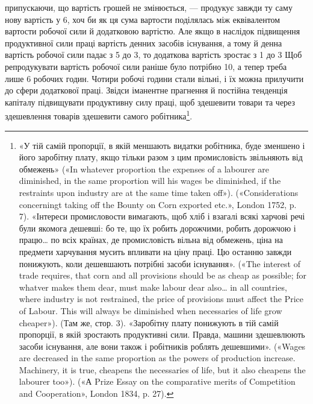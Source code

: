 \parcont{}  %
припускаючи, що вартість грошей не змінюється, — продукує
завжди ту саму нову вартість у 6, хоч би як ця сума
вартости поділялась між еквівалентом вартости робочої сили й
додатковою вартістю. Але якщо в наслідок підвищення продуктивної сили праці
вартість денних засобів існування, а тому й
денна вартість робочої сили падає з 5 до 3, то додаткова
вартість зростає з 1 до 3 Щоб репродукувати
вартість робочої сили раніше було потрібно 10, а тепер треба
лише 6 робочих годин. Чотири робочі години стали вільні, і їх
можна прилучити до сфери додаткової праці. Звідси іманентне
прагнення й постійна тенденція капіталу підвищувати продуктивну
силу праці, щоб здешевити товари та через здешевлення товарів
здешевити самого робітника\footnote{
«У тій самій пропорції, в якій меншають видатки робітника, буде
зменшено і його заробітну плату, якщо тільки разом з цим промисловість
звільняють від обмежень» («In whatever proportion the expenses of a
labourer are diminished, in the same proportion will his wages be diminished,
if the restraints upon industry are at the same time taken off»).
(«Considerations concerningt taking off the Bounty on Corn exported etc.»,
London 1752, p. 7). «Інтереси промисловости вимагають, щоб хліб і
взагалі всякі харчові речі були якомога дешевші: бо те, що їх робить
дорожчими, робить дорожчою і працю\dots{} по всіх країнах, де промисловість
вільна від обмежень, ціна на предмети харчування мусить впливати
на ціну праці. Цю останню завжди понижують, коли дешевшають потрібні
засоби існування». («The interest of trade requires, that corn and all
provisions should be as cheap as possible; for whatver makes them dear, must
make labour dear also\dots{} in all countries, where industry is not restrained,
the price of provisions must affect the Price of Labour. This will always
be diminished when necessaries of life grow cheaper»). (Там же, стор. 3).
«Заробітну плату понижують в тій самій пропорції, в якій зростають
продуктивні сили. Правда, машини здешевлюють засоби існування, але
вони також і робітників роблять дешевшими». («Wages are decreased
in the same proportion as the powers of production increase. Machinery,
it is true, cheapens the necessaries of life, but it also cheapens the labourer
too»). («А Prize Essay on the comparative merits of Competition and
Cooperation», London 1834, p. 27).
}.


